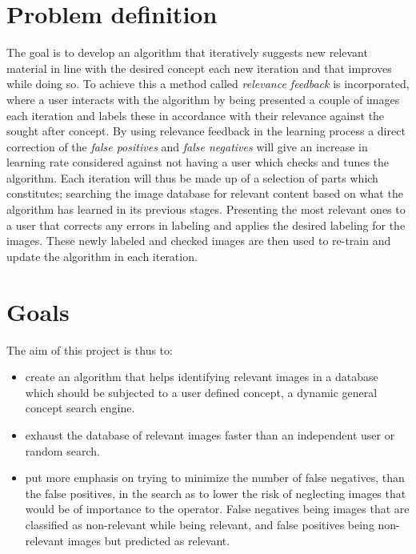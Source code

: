 \section{Problem definition}
The goal is to develop an algorithm that iteratively suggests new relevant material in line with the desired concept each new iteration and that improves while doing so. To achieve this a method called \emph{relevance feedback} is incorporated, where a user interacts with the algorithm by being presented a couple of images each iteration and labels these in accordance with their relevance against the sought after concept. 
By using relevance feedback in the learning process a direct correction of the \emph{false positives} and \emph{false negatives} will give an increase in learning rate considered against not having a user which checks and tunes the algorithm. Each iteration will thus be made up of a selection of parts which constitutes; searching the image database for relevant content based on what the algorithm has learned in its previous stages. Presenting the most relevant ones to a user that corrects any errors in labeling and applies the desired labeling for the images. These newly labeled and checked images are then used to re-train and update the algorithm in each iteration.


\section{Goals}
\label{sec:intro:goals}
The aim of this project is thus to:
\begin{itemize} 
	\item create an algorithm that helps identifying relevant images in a database which should be subjected to a user defined concept, a dynamic general concept search engine. 
	\item exhaust the database of relevant images faster than an independent user or random search. 
	\item put more emphasis on trying to minimize the number of false negatives, than the false positives, in the search as to lower the risk of neglecting images that would be of importance to the operator. False negatives being images that are classified as non-relevant while being relevant, and false positives being non-relevant images but predicted as relevant. 
\end{itemize}
